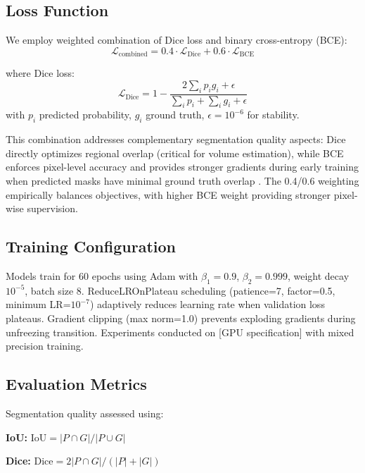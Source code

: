 \documentclass{article}
\begin{document}
\subsection{Loss Function}

We employ weighted combination of Dice loss and binary cross-entropy (BCE):
\begin{equation}
\mathcal{L}_{\text{combined}} = 0.4 \cdot \mathcal{L}_{\text{Dice}} + 0.6 \cdot \mathcal{L}_{\text{BCE}}
\end{equation}

where Dice loss:
\begin{equation}
\mathcal{L}_{\text{Dice}} = 1 - \frac{2 \sum_i p_i g_i + \epsilon}{\sum_i p_i + \sum_i g_i + \epsilon}
\end{equation}
with $p_i$ predicted probability, $g_i$ ground truth, $\epsilon=10^{-6}$ for stability.

This combination addresses complementary segmentation quality aspects: Dice directly optimizes regional overlap (critical for volume estimation), while BCE enforces pixel-level accuracy and provides stronger gradients during early training when predicted masks have minimal ground truth overlap \cite{sudre2017generalised}. The 0.4/0.6 weighting empirically balances objectives, with higher BCE weight providing stronger pixel-wise supervision.

\subsection{Training Configuration}

Models train for 60 epochs using Adam \cite{kingma2014adam} with $\beta_1=0.9$, $\beta_2=0.999$, weight decay $10^{-5}$, batch size 8. ReduceLROnPlateau scheduling (patience=7, factor=0.5, minimum LR=$10^{-7}$) adaptively reduces learning rate when validation loss plateaus. Gradient clipping (max norm=1.0) prevents exploding gradients during unfreezing transition. Experiments conducted on [GPU specification] with mixed precision training.

\subsection{Evaluation Metrics}

Segmentation quality assessed using:

\textbf{IoU:} $\text{IoU} = |P \cap G|/|P \cup G|$

\textbf{Dice:} $\text{Dice} = 2|P \cap G|/(|P| + |G|)$
\end{document}
